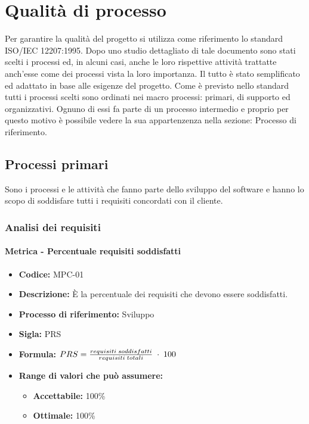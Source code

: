 \section{Qualità di processo}
Per garantire la qualità del progetto si utilizza come riferimento lo standard ISO/IEC 12207:1995. Dopo uno studio dettagliato di tale documento sono stati scelti i processi
ed, in alcuni casi, anche le loro rispettive attività trattatte anch'esse come dei processi vista la loro importanza. Il tutto è stato semplificato ed adattato in base alle 
esigenze del progetto. Come è previsto nello standard tutti i processi scelti sono ordinati nei macro processi: primari, di supporto ed organizzativi. Ognuno di essi fa parte 
di un processo intermedio e proprio per questo motivo è possibile vedere la sua appartenzenza nella sezione: Processo di riferimento.

\subsection{Processi primari}
Sono i processi e le attività che fanno parte dello sviluppo del software e hanno lo scopo di soddisfare tutti i requisiti concordati con il cliente.

\subsubsection{Analisi dei requisiti}
    \paragraph{Metrica - Percentuale requisiti soddisfatti}
    \begin{itemize}
        \item \textbf{Codice:} MPC-01
        \item \textbf{Descrizione:} È la percentuale dei requisiti che devono essere soddisfatti.
        \item \textbf{Processo di riferimento:} Sviluppo
        \item \textbf{Sigla:} PRS
        \item \textbf{Formula:} \begin{math}{PRS = {requisiti \; soddisfatti \over requisiti \; totali}\; \cdot \; 100}\end{math}
        \item \textbf{Range di valori che può assumere:}
        \begin{itemize}
            \item \textbf{Accettabile:} 100\%
            \item \textbf{Ottimale:} 100\%
        \end{itemize}
    \end{itemize}

